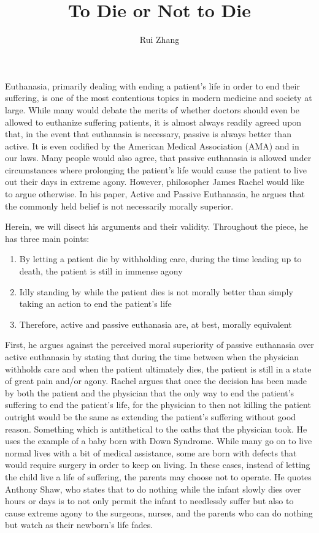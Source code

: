 \documentclass{article}
\begin{document}
\title{To Die or Not to Die}
\author{Rui Zhang}
\maketitle
Euthanasia, primarily dealing with ending a patient's life in order to end their suffering,
is one of the most contentious topics in modern medicine and society at large. While many
would debate the merits of whether doctors should even be allowed to euthanize suffering
patients, it is almost always readily agreed upon that, in the event that euthanasia is necessary,
passive is always better than active. It is even codified by the American Medical Association (AMA)
and in our laws. Many people would also agree, that passive euthanasia is allowed under circumstances
where prolonging the patient's life would cause the patient to live out their days in extreme
agony. However, philosopher James Rachel would like to argue otherwise. In his paper, Active and
Passive Euthanasia, he argues that the commonly held belief is not necessarily morally superior.

Herein, we will disect his arguments and their validity. Throughout the piece, he has three main points:
\begin{enumerate}
    \item By letting a patient die by withholding care, during the time leading up to death, the patient
    is still in immense agony
    \item Idly standing by while the patient dies is not morally better than simply taking an action to
    end the patient's life
    \item Therefore, active and passive euthanasia are, at best, morally equivalent
\end{enumerate}
First, he argues against the perceived moral superiority of passive euthanasia over active euthanasia by
stating that during the time between when the physician withholds care and when the patient ultimately
dies, the patient is still in a state of great pain and/or agony. Rachel argues that once the decision
has been made by both the patient and the physician that the only way to end the patient's suffering
to end the patient's life, for the physician to then not killing the patient outright would be the same
as extending the patient's suffering without good reason. Something which is antithetical to the oaths
that the physician took. He uses the example of a baby born with Down Syndrome. While many go on to
live normal lives with a bit of medical assistance, some are born with defects that would require surgery
in order to keep on living. In these cases, instead of letting the child live a life of suffering, the
parents may choose not to operate. He quotes Anthony Shaw, who states that to do nothing while the infant
slowly dies over hours or days is to not only permit the infant to needlessly suffer but also
to cause extreme agony to the surgeons, nurses, and the parents who can do nothing but watch as their
newborn's life fades.
\end{document}
